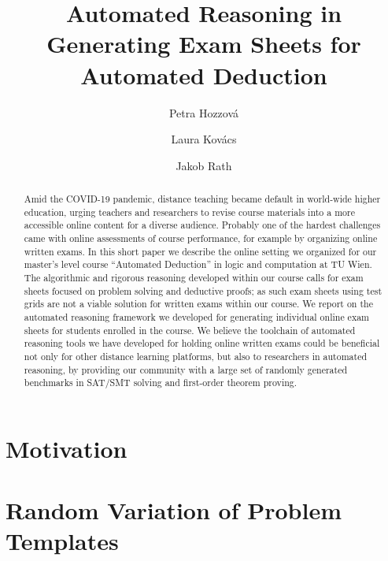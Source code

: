 \documentclass[12pt]{llncs}
\title{Automated Reasoning in Generating Exam Sheets for Automated Deduction}
\author{Petra Hozzov\'a\and
Laura Kov\'acs \and
Jakob Rath}
\institute{
    TU Wien, Austria
}
\begin{document}
\maketitle





\begin{abstract}
Amid the COVID-19 pandemic, distance teaching became default in world-wide higher education,
urging teachers and researchers to revise course materials into a
more accessible online content for a diverse audience. Probably one of the hardest challenges %
came with online assessments of course performance, for example by
organizing online written exams. 
In this short paper we describe the online 
setting  we organized for our master's level course ``Automated
Deduction'' in logic and computation at TU Wien.
The algorithmic and rigorous reasoning developed within our
course calls for exam sheets focused on problem solving and deductive
proofs; as such exam sheets using test grids are not a viable solution
for written exams within our course.
We report on the automated reasoning framework we developed for generating individual online exam sheets for students enrolled in the course.
We believe the toolchain of automated reasoning tools we have developed for
holding online written exams could be beneficial not only for other
distance learning platforms, but also to researchers in automated
reasoning, by providing our community with a large set of randomly generated benchmarks in SAT/SMT solving and first-order theorem proving.
\end{abstract}





\section{Motivation}





%





\section{Random Variation of Problem Templates}\label{sec:smtqf}
\end{document}
